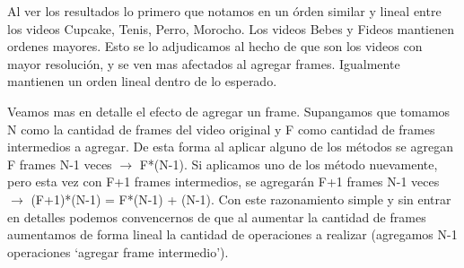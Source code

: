 \begin{figure}[ht]
	\begin{center}
	\end{center}
\end{figure}

\par Al ver los resultados lo primero que notamos en un \'orden similar y lineal entre los videos Cupcake, Tenis, Perro, Morocho. Los videos Bebes y Fideos mantienen ordenes mayores. Esto se lo adjudicamos al hecho de que son los videos con mayor resoluci\'on, y se ven mas afectados al agregar frames. Igualmente mantienen un orden lineal dentro de lo esperado.

\par Veamos mas en detalle el efecto de agregar un frame. Supangamos que tomamos N como la cantidad de frames del video original y F como cantidad de frames intermedios a agregar. De esta forma al aplicar alguno de los m\'etodos se agregan F frames N-1 veces $\longrightarrow$ F*(N-1). Si aplicamos uno de los m\'etodo nuevamente, pero esta vez con F+1 frames intermedios, se agregar\'an F+1 frames N-1 veces $\longrightarrow$ (F+1)*(N-1) = F*(N-1) + (N-1). Con este razonamiento simple y sin entrar en detalles podemos convencernos de que al aumentar la cantidad de frames aumentamos de forma lineal la cantidad de operaciones a realizar (agregamos N-1 operaciones `agregar frame intermedio').